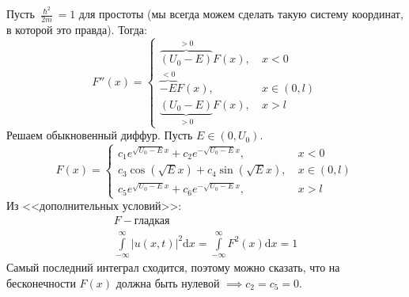 Пусть $\frac{\hslash^2}{2m} = 1$ для простоты (мы всегда можем сделать такую систему координат, в которой это правда). Тогда:
\[
	F''(x) = \left\{ \begin{aligned}
			\overbrace{\left(U_0 - E\right)}^{>0} F(x), ~& x < 0 \\
			\overbrace{-E}^{<0}F(x), ~& x \in (0, l) \\
			\underbrace{\left(U_0 - E\right)}_{>0}F(x), ~& x > l
	\end{aligned}\right.
\]
Решаем обыкновенный диффур. Пусть $E \in (0, U_0)$.
\[
	F(x) = \left\{ \begin{aligned}
			c_1 e^{\sqrt{U_0-E} x} + c_2 e^{-\sqrt{U_0-E}x}, ~& x < 0 \\
			c_3 \cos \left( \sqrt{E}x\right) + c_4 \sin \left( \sqrt{E} x\right), ~& x \in (0, l) \\
			c_5 e^{\sqrt{U_0-E}x} + c_6 e^{-\sqrt{U_0-E}x}, ~& x > l
	\end{aligned}\right.
\]
Из <<дополнительных условий>>:
\[
	\begin{aligned}
		F - \text{гладкая} \\
		\int\limits_{-\infty}^{\infty} \left| u(x,t)\right|^2 \mathrm{d}x = \int\limits_{-\infty}^{\infty} F^2(x)\mathrm{d}x = 1
	\end{aligned}
\]
Самый последний интеграл сходится, поэтому можно сказать, что на бесконечности $F(x)$ должна быть нулевой $\implies c_2=c_5=0$.

